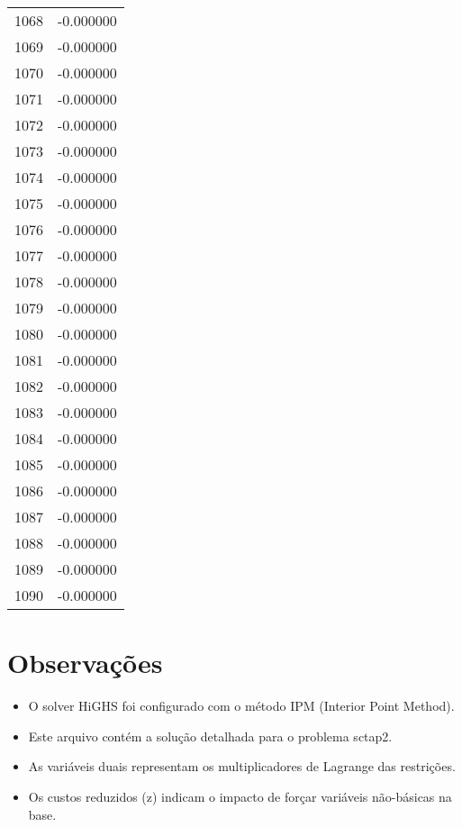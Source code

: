 \documentclass[12pt]{article}
\begin{document}
\begin{longtable}{@{}cc@{}}
1068 & -0.000000 \\
1069 & -0.000000 \\
1070 & -0.000000 \\
1071 & -0.000000 \\
1072 & -0.000000 \\
1073 & -0.000000 \\
1074 & -0.000000 \\
1075 & -0.000000 \\
1076 & -0.000000 \\
1077 & -0.000000 \\
1078 & -0.000000 \\
1079 & -0.000000 \\
1080 & -0.000000 \\
1081 & -0.000000 \\
1082 & -0.000000 \\
1083 & -0.000000 \\
1084 & -0.000000 \\
1085 & -0.000000 \\
1086 & -0.000000 \\
1087 & -0.000000 \\
1088 & -0.000000 \\
1089 & -0.000000 \\
1090 & -0.000000 \\

\end{longtable}


\section{Observações}

\begin{itemize}
\item O solver HiGHS foi configurado com o método IPM (Interior Point Method).
\item Este arquivo contém a solução detalhada para o problema sctap2.
\item As variáveis duais representam os multiplicadores de Lagrange das restrições.
\item Os custos reduzidos (z) indicam o impacto de forçar variáveis não-básicas na base.
\end{itemize}
\end{document}
